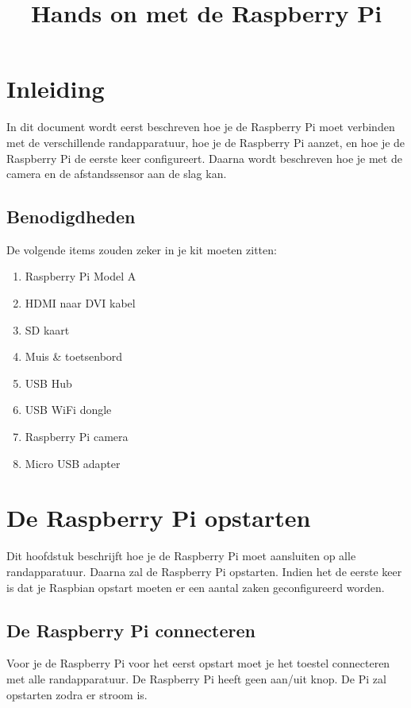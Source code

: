 \documentclass[a4paper]{article}
\title{Hands on met de Raspberry Pi}
\begin{document}
  \maketitle
  \tableofcontents

  \section{Inleiding}

  In dit document wordt eerst beschreven hoe je de Raspberry Pi moet
verbinden met de verschillende randapparatuur, hoe je de Raspberry
Pi aanzet, en hoe je de Raspberry Pi de eerste keer configureert.
Daarna wordt beschreven hoe je met de camera en de afstandssensor aan
de slag kan.

    \subsection{Benodigdheden}

    De volgende items zouden zeker in je kit moeten zitten:

    \begin{enumerate}
      \item Raspberry Pi Model A
      \item HDMI naar DVI kabel
      \item SD kaart
      \item Muis \& toetsenbord
      \item USB Hub
      \item USB WiFi dongle
      \item Raspberry Pi camera
      \item Micro USB adapter
    \end{enumerate}

  \section{De Raspberry Pi opstarten}

    Dit hoofdstuk beschrijft hoe je de Raspberry Pi moet aansluiten op
alle randapparatuur.  Daarna zal de Raspberry Pi opstarten.  Indien
het de eerste keer is dat je Raspbian opstart moeten er een aantal
zaken geconfigureerd worden.

    \subsection{De Raspberry Pi connecteren}

      Voor je de Raspberry Pi voor het eerst opstart moet je het
toestel connecteren met alle randapparatuur.  De Raspberry Pi heeft
geen aan/uit knop.  De Pi zal opstarten zodra er stroom is.
\end{document}
